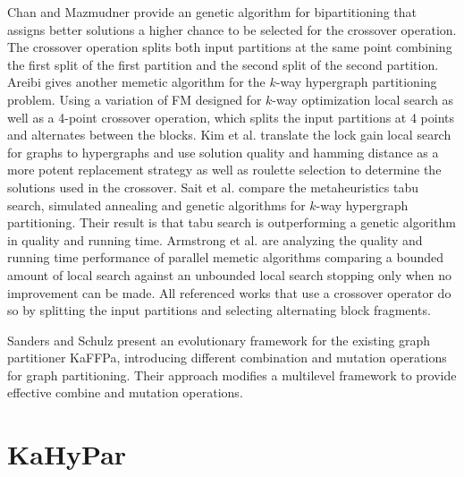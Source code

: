 \documentclass[a4paper,12pt,titlepage, BCOR7mm,headsepline]{scrbook}
\numberwithin{equation}{section}
\begin{document}
Chan and Mazmudner\cite{chan1995systolic} provide an genetic algorithm for bipartitioning that assigns better solutions a higher chance to be selected for the crossover operation. The crossover operation splits both input partitions at the same point combining the first split of the first partition and the second split of the second partition.
Areibi \cite{areibi2000integrated} gives another memetic algorithm for the $k$-way hypergraph partitioning problem. Using a variation of FM designed for $k$-way optimization \cite{sanchis1989multiple} local search as well as a 4-point crossover operation, which splits the input partitions at 4 points and alternates between the blocks.
\cite{kim2004hybrid} Kim et al. translate the lock gain local search \cite{kim2004lock} for graphs to hypergraphs and use solution quality and hamming distance as a more potent replacement strategy as well as roulette selection to determine the solutions used in the crossover.
 Sait et al. \cite{sait2006evolutionary} compare the metaheuristics tabu search, simulated annealing and genetic algorithms for $k$-way hypergraph partitioning. Their result is that tabu search is outperforming a genetic algorithm in quality and running time.
Armstrong et al.\cite{armstrong2010investigation} are analyzing the quality and running time performance of parallel memetic algorithms comparing a bounded amount of local search against an unbounded local search stopping only when no improvement can be made. All referenced works that use a crossover operator do so by splitting the input partitions and selecting alternating block fragments.


Sanders and Schulz present an evolutionary framework \cite{sanders2012distributed} for the existing graph partitioner KaFFPa, \cite{holtgrewe2010engineering} introducing different combination and mutation operations for graph partitioning.  Their approach modifies a multilevel
framework to provide effective combine and mutation operations.

\section{KaHyPar}
\end{document}
